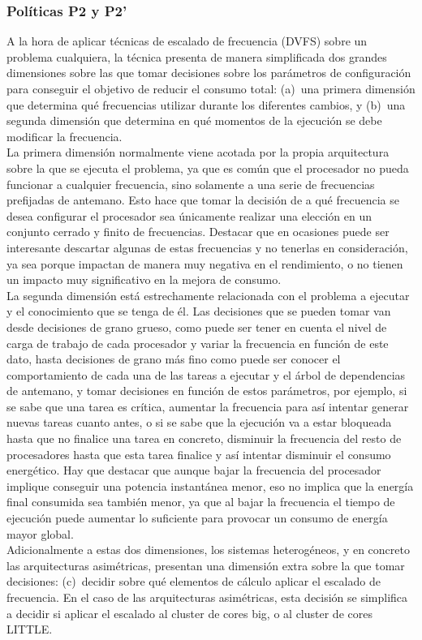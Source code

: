 \subsubsection{Políticas P2 y P2'}
A la hora de aplicar técnicas de escalado de frecuencia (DVFS) sobre un
problema cualquiera, la técnica presenta de manera simplificada dos grandes
dimensiones sobre las que tomar decisiones sobre los parámetros de
configuración para conseguir el objetivo de reducir el consumo total:
(a)~una primera dimensión que determina qué frecuencias utilizar durante
los diferentes cambios, y (b)~una segunda dimensión que determina en qué
momentos de la ejecución se debe modificar la frecuencia.\\
La primera dimensión normalmente viene acotada por la propia arquitectura
sobre la que se ejecuta el problema, ya que es común que el procesador no
pueda funcionar a cualquier frecuencia, sino solamente a una serie de
frecuencias prefijadas de antemano. Esto hace que tomar la decisión de a
qué frecuencia se desea configurar el procesador sea únicamente realizar
una elección en un conjunto cerrado y finito de frecuencias. Destacar que
en ocasiones puede ser interesante descartar algunas de estas frecuencias y
no tenerlas en consideración, ya sea porque impactan de manera muy negativa
en el rendimiento, o no tienen un impacto muy significativo en la mejora de
consumo.\\
La segunda dimensión está estrechamente relacionada con el problema a
ejecutar y el conocimiento que se tenga de él. Las decisiones que se pueden
tomar van desde decisiones de grano grueso, como puede ser tener en cuenta
el nivel de carga de trabajo de cada procesador y variar la frecuencia en
función de este dato, hasta decisiones de grano más fino como puede ser
conocer el comportamiento de cada una de las tareas a ejecutar y el árbol
de dependencias de antemano, y tomar decisiones en función de estos
parámetros, por ejemplo, si se sabe que una tarea es crítica, aumentar la
frecuencia para así intentar generar nuevas tareas cuanto antes, o si se
sabe que la ejecución va a estar bloqueada hasta que no finalice una tarea
en concreto, disminuir la frecuencia del resto de procesadores hasta que
esta tarea finalice y así intentar disminuir el consumo energético. Hay que
destacar que aunque bajar la frecuencia del procesador implique conseguir
una potencia instantánea menor, eso no implica que la energía final
consumida sea también menor, ya que al bajar la frecuencia el tiempo de
ejecución puede aumentar lo suficiente para provocar un consumo de energía
mayor global.\\
Adicionalmente a estas dos dimensiones, los sistemas heterogéneos, y en
concreto las arquitecturas asimétricas, presentan una dimensión extra sobre
la que tomar decisiones: (c)~decidir sobre qué elementos de cálculo aplicar
el escalado de frecuencia. En el caso de las arquitecturas asimétricas,
esta decisión se simplifica a decidir si aplicar el escalado al cluster de
cores big, o al cluster de cores LITTLE.\\
\comentario{}

